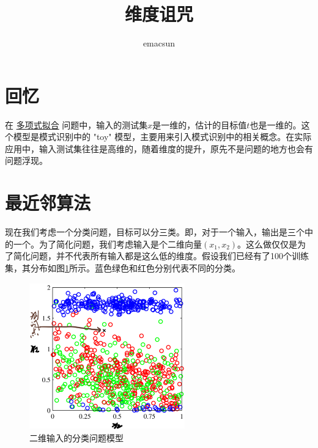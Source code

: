 \documentclass[10pt,a4paper,UTF8]{article}
\author{emacsun}
\date{}
\title{维度诅咒}
\begin{document}
\maketitle
\tableofcontents
{}

\section{回忆}
\label{sec:org385ff7c}


在 \href{PRMLch1dot1-polynomial-curve.org}{多项式拟合} 问题中，输入的测试集\(x\)是一维的，估计的目标值\(t\)也是一维的。这个模型是模式识别中的 "toy" 模型，主要用来引入模式识别中的相关概念。在实际应用中，输入测试集往往是高维的，随着维度的提升，原先不是问题的地方也会有问题浮现。

\section{最近邻算法}
\label{sec:org20f43c4}


现在我们考虑一个分类问题，目标可以分三类。即，对于一个输入，输出是三个中的一个。为了简化问题，我们考虑输入是个二维向量\((x_{1},x_{2})\)。这么做仅仅是为了简化问题，并不代表所有输入都是这么低的维度。假设我们已经有了100个训练集，其分布如图\ref{fig:org87fdd7e}所示。蓝色绿色和红色分别代表不同的分类。
\begin{figure}[htbp]
\centering
\includegraphics[width=0.6\textwidth]{../../img/computer_prml/20170503figure1dot19.png}
\caption{\label{fig:org87fdd7e}
二维输入的分类问题模型}
\end{figure}
\end{document}
